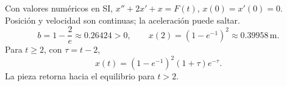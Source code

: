 Con valores numéricos en SI, \(x''+2x'+x=F(t)\), \(x(0)=x'(0)=0\). Posición y velocidad son continuas; la aceleración puede saltar.
\[
b=1-\frac2e\approx0.26424>0,\qquad
x(2)=(1-e^{-1})^2\approx0.39958\,\mathrm m.
\]
Para \(t\ge2\), con \(\tau=t-2\),
\[
x(t)=(1-e^{-1})^2(1+\tau)e^{-\tau}.
\]
La pieza retorna hacia el equilibrio para \(t>2\).
